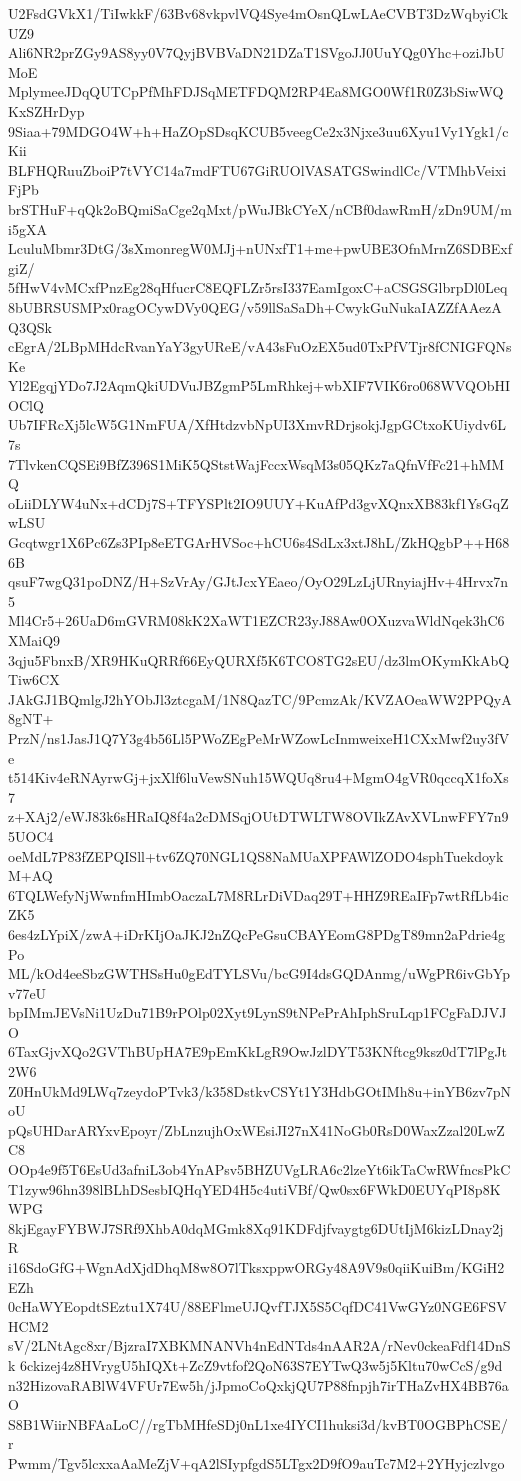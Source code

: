 U2FsdGVkX1/TiIwkkF/63Bv68vkpvlVQ4Sye4mOsnQLwLAeCVBT3DzWqbyiCkUZ9
Ali6NR2prZGy9AS8yy0V7QyjBVBVaDN21DZaT1SVgoJJ0UuYQg0Yhc+oziJbUMoE
MplymeeJDqQUTCpPfMhFDJSqMETFDQM2RP4Ea8MGO0Wf1R0Z3bSiwWQKxSZHrDyp
9Siaa+79MDGO4W+h+HaZOpSDsqKCUB5veegCe2x3Njxe3uu6Xyu1Vy1Ygk1/cKii
BLFHQRuuZboiP7tVYC14a7mdFTU67GiRUOlVASATGSwindlCc/VTMhbVeixiFjPb
brSTHuF+qQk2oBQmiSaCge2qMxt/pWuJBkCYeX/nCBf0dawRmH/zDn9UM/mi5gXA
LculuMbmr3DtG/3sXmonregW0MJj+nUNxfT1+me+pwUBE3OfnMrnZ6SDBExfgiZ/
5fHwV4vMCxfPnzEg28qHfucrC8EQFLZr5rsI337EamIgoxC+aCSGSGlbrpDl0Leq
8bUBRSUSMPx0ragOCywDVy0QEG/v59llSaSaDh+CwykGuNukaIAZZfAAezAQ3QSk
cEgrA/2LBpMHdcRvanYaY3gyUReE/vA43sFuOzEX5ud0TxPfVTjr8fCNIGFQNsKe
Yl2EgqjYDo7J2AqmQkiUDVuJBZgmP5LmRhkej+wbXIF7VIK6ro068WVQObHIOClQ
Ub7IFRcXj5lcW5G1NmFUA/XfHtdzvbNpUI3XmvRDrjsokjJgpGCtxoKUiydv6L7s
7TlvkenCQSEi9BfZ396S1MiK5QStstWajFccxWsqM3s05QKz7aQfnVfFc21+hMMQ
oLiiDLYW4uNx+dCDj7S+TFYSPlt2IO9UUY+KuAfPd3gvXQnxXB83kf1YsGqZwLSU
Gcqtwgr1X6Pc6Zs3PIp8eETGArHVSoc+hCU6s4SdLx3xtJ8hL/ZkHQgbP++H686B
qsuF7wgQ31poDNZ/H+SzVrAy/GJtJcxYEaeo/OyO29LzLjURnyiajHv+4Hrvx7n5
Ml4Cr5+26UaD6mGVRM08kK2XaWT1EZCR23yJ88Aw0OXuzvaWldNqek3hC6XMaiQ9
3qju5FbnxB/XR9HKuQRRf66EyQURXf5K6TCO8TG2sEU/dz3lmOKymKkAbQTiw6CX
JAkGJ1BQmlgJ2hYObJl3ztcgaM/1N8QazTC/9PcmzAk/KVZAOeaWW2PPQyA8gNT+
PrzN/ns1JasJ1Q7Y3g4b56Ll5PWoZEgPeMrWZowLcInmweixeH1CXxMwf2uy3fVe
t514Kiv4eRNAyrwGj+jxXlf6luVewSNuh15WQUq8ru4+MgmO4gVR0qccqX1foXs7
z+XAj2/eWJ83k6sHRaIQ8f4a2cDMSqjOUtDTWLTW8OVIkZAvXVLnwFFY7n95UOC4
oeMdL7P83fZEPQISll+tv6ZQ70NGL1QS8NaMUaXPFAWlZODO4sphTuekdoykM+AQ
6TQLWefyNjWwnfmHImbOaczaL7M8RLrDiVDaq29T+HHZ9REaIFp7wtRfLb4icZK5
6es4zLYpiX/zwA+iDrKIjOaJKJ2nZQcPeGsuCBAYEomG8PDgT89mn2aPdrie4gPo
ML/kOd4eeSbzGWTHSsHu0gEdTYLSVu/bcG9I4dsGQDAnmg/uWgPR6ivGbYpv77eU
bpIMmJEVsNi1UzDu71B9rPOlp02Xyt9LynS9tNPePrAhIphSruLqp1FCgFaDJVJO
6TaxGjvXQo2GVThBUpHA7E9pEmKkLgR9OwJzlDYT53KNftcg9ksz0dT7lPgJt2W6
Z0HnUkMd9LWq7zeydoPTvk3/k358DstkvCSYt1Y3HdbGOtIMh8u+inYB6zv7pNoU
pQsUHDarARYxvEpoyr/ZbLnzujhOxWEsiJI27nX41NoGb0RsD0WaxZzal20LwZC8
OOp4e9f5T6EsUd3afniL3ob4YnAPsv5BHZUVgLRA6c2lzeYt6ikTaCwRWfncsPkC
T1zyw96hn398lBLhDSesbIQHqYED4H5c4utiVBf/Qw0sx6FWkD0EUYqPI8p8KWPG
8kjEgayFYBWJ7SRf9XhbA0dqMGmk8Xq91KDFdjfvaygtg6DUtIjM6kizLDnay2jR
i16SdoGfG+WgnAdXjdDhqM8w8O7lTksxppwORGy48A9V9s0qiiKuiBm/KGiH2EZh
0cHaWYEopdtSEztu1X74U/88EFlmeUJQvfTJX5S5CqfDC41VwGYz0NGE6FSVHCM2
sV/2LNtAgc8xr/BjzraI7XBKMNANVh4nEdNTds4nAAR2A/rNev0ckeaFdf14DnSk
6ckizej4z8HVrygU5hIQXt+ZcZ9vtfof2QoN63S7EYTwQ3w5j5Kltu70wCcS/g9d
n32HizovaRABlW4VFUr7Ew5h/jJpmoCoQxkjQU7P88fnpjh7irTHaZvHX4BB76aO
S8B1WiirNBFAaLoC//rgTbMHfeSDj0nL1xe4IYCI1huksi3d/kvBT0OGBPhCSE/r
Pwmm/Tgv5lcxxaAaMeZjV+qA2lSIypfgdS5LTgx2D9fO9auTc7M2+2YHyjczlvgo
